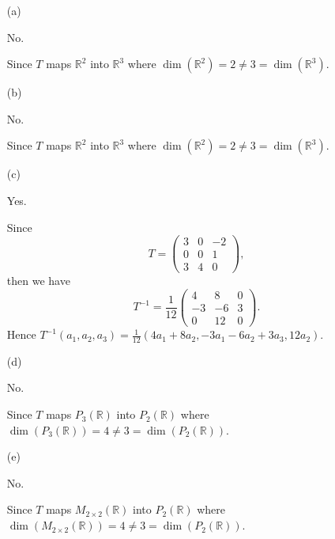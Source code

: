 \begin{Exercise}
	\begin{enumerate}[(a)]
		\item[(a)]
		\begin{answer}
			No.
		\end{answer}
		\begin{solution}
			Since $T$ maps $\mathbb{R}^2$ into $\mathbb{R}^3$ where $\dim(\mathbb{R}^2) = 2 \neq 3 = \dim(\mathbb{R}^3)$.
		\end{solution}
		
		\item[(b)]
		\begin{answer}
			No.
		\end{answer}
		\begin{solution}
			Since $T$ maps $\mathbb{R}^2$ into $\mathbb{R}^3$ where $\dim(\mathbb{R}^2) = 2 \neq 3 = \dim(\mathbb{R}^3)$.
		\end{solution}
		
		\item[(c)]
		\begin{answer}
			Yes.
		\end{answer}
		\begin{solution}
			Since
			$$
			T = \begin{pmatrix}
			3 & 0 & -2 \\
			0 & 0 & 1 \\
			3 & 4 & 0
			\end{pmatrix},
			$$
			then we have
			$$
			T^{-1} = \frac{1}{12}\begin{pmatrix}
			4 & 8 & 0 \\
			-3 & -6 & 3 \\
			0 & 12 & 0
			\end{pmatrix}.
			$$
			Hence $T^{-1}(a_1,a_2,a_3) = \frac{1}{12}(4a_1+8a_2,-3a_1-6a_2+3a_3,12a_2)$.
		\end{solution}
		
		\item[(d)]
		\begin{answer}
			No.
		\end{answer}
		\begin{solution}
			Since $T$ maps $P_3(\mathbb{R})$ into $P_2(\mathbb{R})$ where $\dim(P_3(\mathbb{R})) = 4 \neq 3 = \dim(P_2(\mathbb{R}))$.
		\end{solution}
		
		\item[(e)]
		\begin{answer}
			No.
		\end{answer}
		\begin{solution}
			Since $T$ maps $M_{2\times 2}(\mathbb{R})$ into $P_2(\mathbb{R})$ where $\dim(M_{2\times 2}(\mathbb{R})) = 4 \neq 3 = \dim(P_2(\mathbb{R}))$.
		\end{solution}
		

\end{enumerate}
\end{Exercise}
